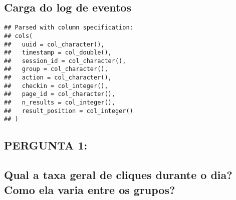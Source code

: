 \documentclass[]{article}
\newenvironment{Shaded}{\begin{snugshade}}{\end{snugshade}}
\newcommand{\KeywordTok}[1]{\textcolor[rgb]{0.13,0.29,0.53}{\textbf{#1}}}
\newcommand{\DataTypeTok}[1]{\textcolor[rgb]{0.13,0.29,0.53}{#1}}
\newcommand{\StringTok}[1]{\textcolor[rgb]{0.31,0.60,0.02}{#1}}
\newcommand{\CommentTok}[1]{\textcolor[rgb]{0.56,0.35,0.01}{\textit{#1}}}
\newcommand{\OtherTok}[1]{\textcolor[rgb]{0.56,0.35,0.01}{#1}}
\newcommand{\OperatorTok}[1]{\textcolor[rgb]{0.81,0.36,0.00}{\textbf{#1}}}
\newcommand{\NormalTok}[1]{#1}
\begin{document}
\subsection{Carga do log de eventos}\label{carga-do-log-de-eventos}

\begin{Shaded}
\end{Shaded}

\begin{verbatim}
## Parsed with column specification:
## cols(
##   uuid = col_character(),
##   timestamp = col_double(),
##   session_id = col_character(),
##   group = col_character(),
##   action = col_character(),
##   checkin = col_integer(),
##   page_id = col_character(),
##   n_results = col_integer(),
##   result_position = col_integer()
## )
\end{verbatim}

\begin{Shaded}
\end{Shaded}

\subsection{PERGUNTA 1:}\label{pergunta-1}

\subsection{Qual a taxa geral de cliques durante o dia? Como ela varia
entre os
grupos?}\label{qual-a-taxa-geral-de-cliques-durante-o-dia-como-ela-varia-entre-os-grupos}
\end{document}
